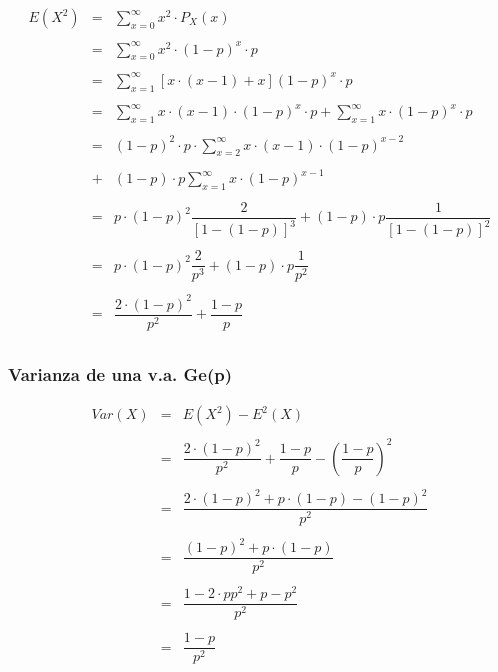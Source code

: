 \documentclass[
]{article}
\begin{document}
\[\begin{array}{rcl}
  E(X^2) &=& \sum\limits_{x=0}^\infty x^2 \cdot P_X(x)\\\\
  &=& \sum\limits_{x=0}^\infty x^2 \cdot (1-p)^x \cdot p\\\\
  &=& \sum\limits_{x=1}^\infty \left[x\cdot (x-1)+x \right] (1-p)^{x} \cdot p\\\\
  &=&\sum\limits_{x=1}^\infty x\cdot (x-1)\cdot (1-p)^x\cdot p + \sum\limits_{x=1}^\infty x\cdot (1-p)^x \cdot p\\\\
  &=&(1-p)^2\cdot p \cdot \sum\limits_{x=2}^\infty x\cdot (x-1)\cdot (1-p)^{x-2}\\\\
  &+&(1-p)\cdot p\sum\limits_{x=1}^\infty x\cdot (1-p)^{x-1} \\\\
  &=&p\cdot (1-p)^2 \dfrac{2}{\left[1-(1-p)\right]^3} + (1-p)\cdot p \dfrac{1}{\left[1-(1-p)\right]^2}\\\\
  &=&p\cdot (1-p)^2 \dfrac{2}{p^3}+(1-p)\cdot p \dfrac{1}{p^2}\\\\
  &=&\dfrac{2\cdot(1-p)^2}{p^2}+\dfrac{1-p}{p}\\
\end{array}\]

\hypertarget{varianza-de-una-v.a.-gep}{%
\subsubsection{Varianza de una v.a.
Ge(p)}\label{varianza-de-una-v.a.-gep}}

\[\begin{array}{rcl}
  Var(X)&=&E(X^2) - E^2(X)\\\\
  &=&\dfrac{2\cdot(1-p)^2}{p^2}+\dfrac{1-p}{p}-\left(\dfrac{1-p}{p}\right)^2\\\\
  &=&\dfrac{2\cdot(1-p)^2+p\cdot (1-p)-(1-p)^2}{p^2}\\\\
  &=&\dfrac{(1-p)^2 + p\cdot (1-p)}{p^2}\\\\
  &=&\dfrac{1-2\cdot p p^2 + p - p^2}{p^2}\\\\
  &=&\dfrac{1-p}{p^2}\\\\
\end{array}\]
\end{document}
